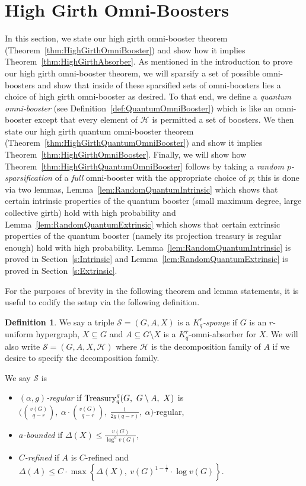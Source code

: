 \documentclass[11pt]{article}
\newcommand{\mc}[1]{\mathcal{#1}}
\newcounter{i}
\theoremstyle{plain}
\theoremstyle{plain} %
\theoremstyle{definition}
\newtheorem{definition}[thm]{Definition}
\begin{document}
\section{High Girth Omni-Boosters}\label{s:GirthOmniBoosters}

In this section, we state our high girth omni-booster theorem (Theorem~\ref{thm:HighGirthOmniBooster}) and show how it implies Theorem~\ref{thm:HighGirthAbsorber}. As mentioned in the introduction to prove our high girth omni-booster theorem, we will sparsify a set of possible omni-boosters and show that inside of these sparsified sets of omni-boosters lies a choice of high girth omni-booster as desired. To that end, we define a \emph{quantum omni-booster} (see Definition~\ref{def:QuantumOmniBooster}) which is like an omni-booster except that every element of $\mc{H}$ is permitted a set of boosters. We then state our high girth quantum omni-booster theorem (Theorem~\ref{thm:HighGirthQuantumOmniBooster}) and show it implies Theorem~\ref{thm:HighGirthOmniBooster}. Finally, we will show how Theorem~\ref{thm:HighGirthQuantumOmniBooster} follows by taking a \emph{random $p$-sparsification} of a \emph{full} omni-booster with the appropriate choice of $p$; this is done via two lemmas, Lemma~\ref{lem:RandomQuantumIntrinsic} which shows that certain intrinsic properties of the quantum booster (small maximum degree, large collective girth) hold with high probability and Lemma~\ref{lem:RandomQuantumExtrinsic} which shows that certain extrinsic properties of the quantum booster (namely its projection treasury is regular enough) hold with high probability. Lemma~\ref{lem:RandomQuantumIntrinsic} is proved in Section~\ref{s:Intrinsic} and Lemma~\ref{lem:RandomQuantumExtrinsic} is proved in Section~\ref{s:Extrinsic}.

For the purposes of brevity in the following theorem and lemma statements, it is useful to codify the setup via the following definition.

\begin{definition}
We say a triple $\mc{S}=(G,A,X)$ is a \emph{$K_q^r$-sponge} if $G$ is an $r$-uniform hypergraph, $X\subseteq G$ and $A\subseteq G\setminus X$ is a $K_q^r$-omni-absorber for $X$. We will also write $\mc{S}=(G,A,X,\mc{H})$ where $\mc{H}$ is the decomposition family of $A$ if we desire to specify the decomposition family.

We say $\mc{S}$ is 
\begin{itemize}
    \item \emph{$(\alpha,g)$-regular} if ${\rm Treasury}_q^g(G,~G\setminus A,~X)$ is $\bigg(\binom{v(G)}{q-r},~\alpha\cdot \binom{v(G)}{q-r},~\frac{1}{2g(q-r)},~\alpha\bigg)$-regular, 
    \item \emph{$a$-bounded} if $\Delta(X)\le \frac{v(G)}{\log^a v(G)}$, 
    \item \emph{$C$-refined} if $A$ is $C$-refined and $\Delta(A)\le C\cdot \max\left\{ \Delta(X),~v(G)^{1-\frac{1}{r}}\cdot \log v(G)\right\}$.
\end{itemize}
\end{definition}
\end{document}

